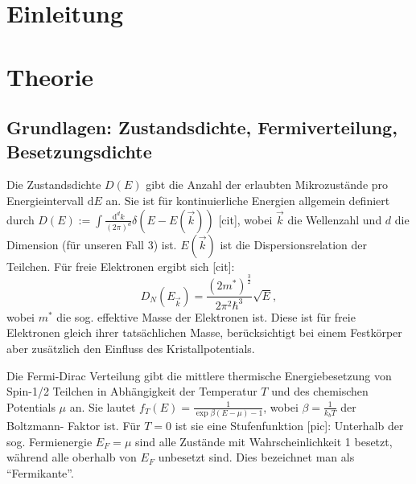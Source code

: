 \documentclass[twoside,        %
               BCOR12mm,       %
               english,ngerman, %
               fleqn,headsepline=false,footsepline=false
              ]{Vorlage/MFPREPORT}
\renewcommand{\d}{\ensuremath{\mathrm{d}}} %
\begin{document}
\date{\today}
\CopyNotWanted

\maketitle


\tableofcontents

\clearpage
{}

\section{Einleitung}
\label{sec:einleitung}
\section{Theorie}
\label{sec:theorie}
\subsection{Grundlagen: Zustandsdichte, Fermiverteilung, Besetzungsdichte}
Die Zustandsdichte $D(E)$ gibt die Anzahl der erlaubten Mikrozustände pro
Energieintervall $\d E$ an. Sie ist für kontinuierliche Energien allgemein
definiert durch $D(E):=\int \frac{\d^d k}{(2
\pi)^d}\delta\left(E-E(\vec{k})\right)$ [cit],
wobei $\vec k$ die Wellenzahl und $d$ die Dimension (für unseren Fall 3) ist.
$E(\vec k)$ ist die Dispersionsrelation der Teilchen.
Für freie Elektronen ergibt sich [cit]:
\begin{equation}
    \label{eq:freielek}
   D_N(E_{\vec{k}})=\frac{\left(2m^*\right)^\frac{3}{2}}{2\pi ^2\hbar ^3}\sqrt{E}, 
\end{equation}
wobei $m^*$ die sog. effektive Masse der Elektronen ist. Diese ist für freie
Elektronen gleich ihrer tatsächlichen Masse, berücksichtigt bei einem
Festkörper aber zusätzlich den Einfluss des Kristallpotentials.

Die Fermi-Dirac Verteilung gibt die mittlere thermische Energiebesetzung von Spin-1/2
Teilchen in Abhängigkeit der Temperatur $T$ und des chemischen Potentials $\mu$
an. Sie lautet $f_T(E)=\frac{1}{\exp{\beta(E-\mu)-1}}$, wobei
$\beta=\frac{1}{k_b T}$ der Boltzmann- Faktor ist. Für $T=0$ ist sie eine
Stufenfunktion [pic]: Unterhalb der sog. Fermienergie $E_F=\mu$ sind alle
Zustände mit Wahrscheinlichkeit 1 besetzt, während alle oberhalb von $E_F$
unbesetzt sind. Dies bezeichnet man als ``Fermikante''.
\end{document}
